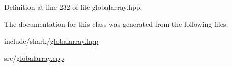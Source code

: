 Definition at line 232 of file globalarray.\+hpp.



The documentation for this class was generated from the following files\+:\begin{DoxyCompactItemize}
\item 
include/shark/\hyperlink{globalarray_8hpp}{globalarray.\+hpp}\item 
src/\hyperlink{globalarray_8cpp}{globalarray.\+cpp}\end{DoxyCompactItemize}
